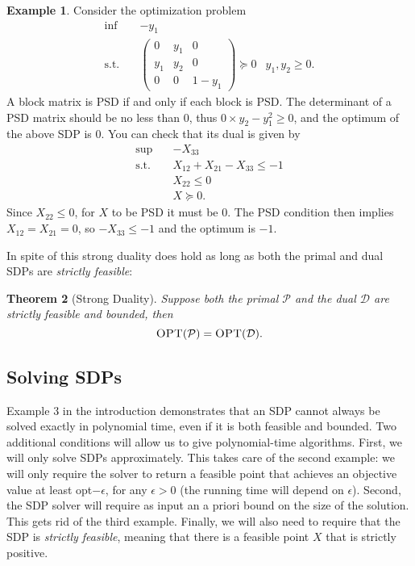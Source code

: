 \documentclass[11pt, letterpaper]{article}
\newtheorem{theorem}{Theorem}[section]
\theoremstyle{remark}
\theoremstyle{definition}
\newtheorem{example}[theorem]{Example}
\numberwithin{equation}{section}
\newcommand{\eps}{\epsilon}
\newcommand{\1}{\mathbb{1}}
\begin{document}
\begin{example}
Consider the optimization problem
\begin{align}
\inf\quad & -y_1 \nonumber\\
\text{s.t.}\quad & \left(\begin{array}{ccc}
0&y_1&0\\
y_1&y_2&0\\
0&0&1-y_1
\end{array}\right)\succeq 0
& y_1,y_2\geq 0.
\end{align}
A block matrix is PSD if and only if each block is PSD. The determinant of a PSD matrix should be no less than $0$, thus $0\times y_2 -y_1^{2} \geq 0$, and the optimum of the above SDP is $0$. You can check that its dual is given by
\begin{align}
\sup\quad & - X_{33} \nonumber\\
\text{s.t.}\quad & X_{12}+X_{21}-X_{33}\leq -1 \nonumber\\
& X_{22}\leq 0 \nonumber\\
& X\succeq 0. \nonumber
\end{align}
Since $ X_{22} \leq 0$, for $X$ to be PSD it must be $0$. The PSD condition then implies $X_{12}=X_{21}=0$, so $-X_{33}\leq -1$ and the optimum is $-1$.
\end{example}

In spite of this strong duality does hold as long as both the primal and dual SDPs are \emph{strictly feasible}:

\begin{theorem}[Strong Duality]
Suppose both the primal $\mathcal{P}$ and the dual $\mathcal{D}$ are strictly feasible and bounded, then
$$
\textsc{OPT}(\mathcal{P})= \textsc{OPT}(\mathcal{D}).
$$
\end{theorem}


\subsection{Solving SDPs}

Example 3 in the introduction demonstrates that an SDP cannot always be solved exactly in polynomial time, even if it is both feasible and bounded. Two additional conditions will allow us to give polynomial-time algorithms. First, we will only solve SDPs approximately. This takes care of the second example: we will only require the solver to return a feasible point that achieves an objective value at least opt$-\eps$, for any $\eps>0$ (the running time will depend on $\eps$). Second, the SDP solver will require as input an a priori bound on the size of the solution. This gets rid of the third example. Finally, we will also need to require that the SDP is \emph{strictly feasible}, meaning that there is a feasible point $X$ that is strictly positive. 
\end{document}
